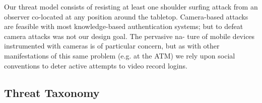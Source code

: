 Our threat model consists of resisting at least one shoulder surfing attack from an observer co-located at any position around the tabletop. Camera-based attacks are feasible with most knowledge-based authentication systems; but to defeat camera attacks was not our design goal. The pervasive na- ture of mobile devices instrumented with cameras is of particular concern, but as with other manifestations of this same problem (e.g. at the ATM) we rely upon social conventions to deter active attempts to video record logins.

\subsection{Threat Taxonomy}